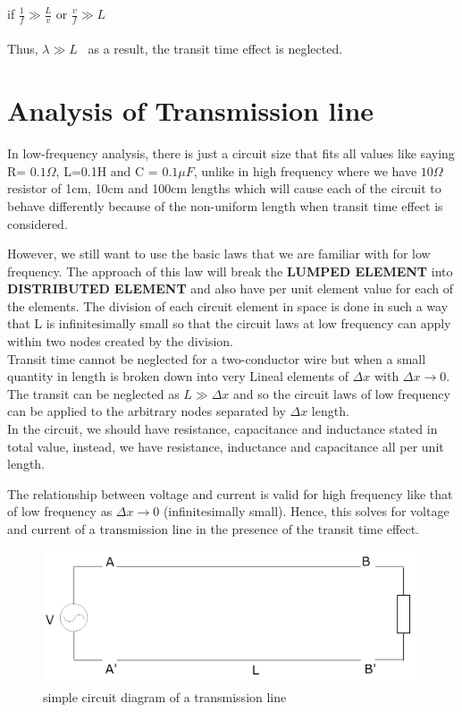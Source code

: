 if \hspace{0.05in}  $ \frac{1}{f} \gg \frac{L}{v} $ or $ \frac{v}{f} \gg L $ \\\\
Thus, $ \lambda \gg L $ \ as a result, the transit time effect is neglected.

\section{Analysis of Transmission line}
In low-frequency analysis, there is just a circuit size that fits all values like saying R= $ 0.1\Omega $, L=0.1H and C = $ 0.1\mu F $, unlike in high frequency where we have $ 10\Omega $ resistor of 1cm, 10cm and 100cm lengths which will cause each of the circuit to behave differently because of the non-uniform length when transit time effect is considered.

However, we still want to use the basic laws that we are familiar with for low frequency. The approach of this law will break the\textbf{ LUMPED ELEMENT} into \textbf{DISTRIBUTED ELEMENT} and also have per unit element value for each of the elements. The division of each circuit element in space is done in such a way that L is infinitesimally small so that the circuit laws at low frequency can apply within two nodes created by the division.\\

Transit time cannot be neglected for a two-conductor wire but when a small quantity in length is broken down into very Lineal elements of $ \Delta x $ with  $  \Delta x \rightarrow 0 $. The transit can be neglected as $ L \gg \Delta x $ and so the circuit laws of low frequency can be applied to the arbitrary nodes separated by $ \Delta x $ length. \\
In the circuit, we should have resistance, capacitance and inductance stated in total value, instead, we have resistance, inductance and capacitance all per unit length.

The relationship between voltage and current is valid for high frequency like that of low frequency as $ \Delta x  \rightarrow 0$ (infinitesimally small). Hence, this solves for voltage and current of a transmission line in the presence of the transit time effect.\\
\begin{figure}[h]
\centering
\includegraphics[width=1\linewidth]{./graphics/second}
\caption{simple circuit diagram of a transmission line}
\end{figure}	


